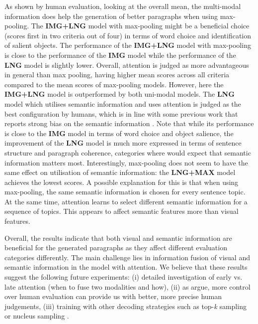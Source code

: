 \documentclass[11pt,a4paper]{article}
\begin{document}
As shown by human evaluation, looking at the overall mean, the multi-modal information does help the generation of better paragraphs when using max-pooling.
The \textbf{IMG+LNG} model with max-pooling might be a beneficial choice (scores first in two criteria out of four) in terms of word choice and identification of salient objects. %
The performance of the \textbf{IMG+LNG} model with max-pooling is close to the performance of the \textbf{IMG} model while the performance of the \textbf{LNG} model is slightly lower.
Overall, attention is judged as more advantageous in general than max pooling, having higher mean scores across all criteria compared to the mean scores of max-pooling models.
However, here the \textbf{IMG+LNG} model is outperformed by both uni-modal models.
The \textbf{LNG} model which utilises semantic information and uses attention is judged as the best configuration by humans, which is in line with some previous work that reports strong bias on the semantic information \cite{Agrawal:2017aa}.
Note that while its performance is close to the \textbf{IMG} model in terms of word choice and object salience, the improvement of the \textbf{LNG} model is much more expressed in terms of sentence structure and paragraph coherence, categories where would expect that semantic information matters most.
Interestingly, max-pooling does not seem to have the same effect on utilisation of semantic information: the \textbf{LNG+MAX} model achieves the lowest scores.
A possible explanation for this is that when using max-pooling, the same semantic information is chosen for every sentence topic.
At the same time, attention learns to select different semantic information for a sequence of topics.
This appears to affect semantic features more than visual features.

Overall, the results indicate that both visual and semantic information are beneficial for the generated paragraphs as they affect different evaluation categories differently. The main challenge lies in information fusion of visual and semantic information in the model with attention.
We believe that these results suggest the following future experiments: (i) detailed investigation of early vs. late attention (when to fuse two modalities and how), (ii) as  argue, more control over human evaluation can provide us with better, more precise human judgements, (iii) training with other decoding strategies such as top-\textit{k} sampling or nucleus sampling \cite{Holtzman2019}.
\end{document}
